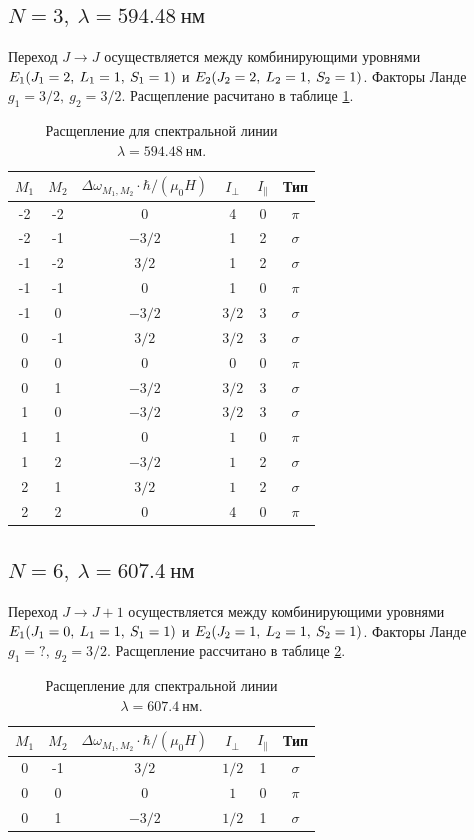 \documentclass[12pt]{article}
\begin{document}
	\subsection*{$N=3,\:\lambda = 594.48\ \text{нм}$}
	Переход $J \rightarrow J$	осуществляется между комбинирующими уровнями $E_1\qty(J_1 = 2,\: L_1 = 1,\: S_1 = 1)$ и $E_2\qty(J_2 = 2,\: L_2 = 1,\: S_2 = 1)$. Факторы Ланде $g_1 = 3/2,\: g_2 = 3/2$. Расщепление расчитано в таблице \ref{table:2}.
	\begin{table}[h!]
		\centering
		\begin{tabular}{|c c c c c c|} 
 			\hline
 			$M_1$ & $M_2$ & $\Delta \omega_{M_1, M_2} \cdot \hbar / (\mu_0 H)$ & $I_{\perp}$ & $I_{\|}$ & Тип \\ [0.5ex] 
 			\hline
 			-2 & -2 & 0 & 4 & 0 & $\pi$ \\
 			-2 & -1 & $-3/2$ & 1 & 2 & $\sigma$ \\
 			-1 & -2 & $3/2$ & 1 & 2 & $\sigma$ \\
 			-1 & -1 & $0$ & 1 & 0 & $\pi$ \\
 			-1 & 0 & $-3/2$ & $3/2$ & 3 & $\sigma$ \\
 			0 & -1 & $3/2$ & $3/2$ & 3 & $\sigma$ \\
 			0 & 0 & $0$ & $0$ & 0 & $\pi$ \\
 			0 & 1 & $-3/2$ & $3/2$ & 3 & $\sigma$ \\
 			1 & 0 & $-3/2$ & $3/2$ & 3 & $\sigma$ \\
 			1 & 1 & $0$ & $1$ & 0 & $\pi$ \\
 			1 & 2 & $-3/2$ & $1$ & 2 & $\sigma$ \\
 			2 & 1 & $3/2$ & $1$ & 2 & $\sigma$ \\
 			2 & 2 & 0 & 4 & 0 & $\pi$ \\
 			\hline
		\end{tabular}
		\caption{Расщепление для спектральной линии $\lambda = 594.48\ \text{нм}$.}
		\label{table:2}
	\end{table}

	\subsection*{$N=6,\:\lambda = 607.4\ \text{нм}$}
	Переход $J \rightarrow J+1$	осуществляется между комбинирующими уровнями $E_1\qty(J_1 = 0,\: L_1 = 1,\: S_1 = 1)$ и $E_2\qty(J_2 = 1,\: L_2 = 1,\: S_2 = 1)$. Факторы Ланде $g_1 = ?,\: g_2 = 3/2$. Расщепление рассчитано в таблице \ref{table:3}.
	\begin{table}[h!]
		\centering
		\begin{tabular}{|c c c c c c|} 
 			\hline
 			$M_1$ & $M_2$ & $\Delta \omega_{M_1, M_2} \cdot \hbar / (\mu_0 H)$ & $I_{\perp}$ & $I_{\|}$ & Тип \\ [0.5ex] 
 			\hline
 			0 & -1 & $3/2$ & $1/2$ & 1 & $\sigma$ \\
 			0 & 0 & 0 & $1$ & 0 & $\pi$ \\
 			0 & 1 & $-3/2$ & $1/2$ & 1 & $\sigma$ \\
 			\hline
		\end{tabular}
		\caption{Расщепление для спектральной линии $\lambda = 607.4\ \text{нм}$.}
		\label{table:3}
	\end{table}
\end{document}
